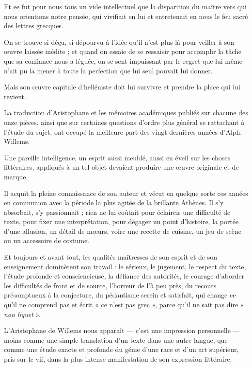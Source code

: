 \documentclass{book}%
\newcommand{\italique}[1]{\textit{#1}}%
\begin{document}
Et ee fut pour nous tous un vide intellectuel que la disparition du maître vers qui nous orientions notre pensée, qui vivifiait en lui et entretenait en nous le feu sacré des lettres grecques. 

On se trouve si déçu, si dépourvu à l'idée qu'il n'est plus là pour veiller à son œuvre laissée inédite ; et quand on essaie de se ressaisir pour accomplir la tâche que sa confiance nous a léguée, on se sent impuissant par le regret que lui-même n'ait pu la mener à toute la perfection que lui seul pouvait lui donner. 

Mais son œuvre capitale d'helléniste doit lui survivre et prendre la place qui lui revient. 

La traduction d'Aristophane et les mémoires académiques publiés sur chacune des onze pièces, ainsi que sur certaines questions d'ordre plus général se rattachant à l'étude du sujet, ont occupé la meilleure part des vingt dernières années d'Alph. Willems. 

Une pareille intelligence, un esprit aussi meublé, aussi en éveil sur les choses littéraires, appliqués à un tel objet devaient produire une œuvre originale et de marque. 

Il acquit la pleine connaissance de son auteur et vécut en quelque sorte ces années en communion avec la période la plus agitée de la brillante Athènes. Il s'y absorbait, s'y passionnait ; rien ne lui coûtait pour éclaircir une difficulté de texte, pour fixer une interprétation, pour dégager un point d'histoire, la portée d'une allusion, un détail de mœurs, voire une recette de cuisine, un jeu de scène ou un accessoire de costume. 

Et toujours et avant tout, les qualités maîtresses de son esprit et de son enseignement dominèrent son travail : le sérieux, le jugement, le respect du texte, l'étude profonde et consciencieuse, la défiance des autorités, le courage d'aborder les difficultés de front et de source, l'horreur de l'à peu près, du recours présomptueux à la conjecture, du pédantisme serein et satisfait, qui change ce qu'il ne comprend pas et écrit « ce n'est pas grec », parce qu'il ne sait pas dire « \italique{non liquet} ». 

L'Aristophane de Willems nous apparaît — c'est une impression personnelle — moins comme une simple translation d'un texte dans une autre langue, que comme une étude exacte et profonde du génie d'une race et d'un art supérieur, pris sur le vif, dans la plus intense manifestation de son expression littéraire. 
\end{document}

